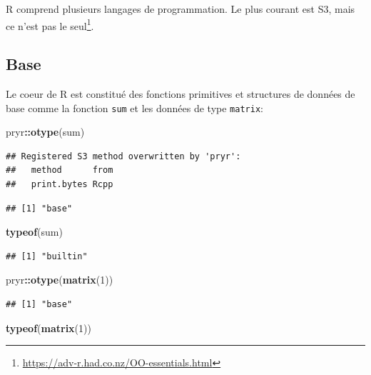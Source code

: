 \documentclass[
  12pt,
  french,
  a4paper,
  extrafontsizes,onecolumn,openright
  ]{memoir}
\newenvironment{Shaded}{\begin{snugshade}}{\end{snugshade}}
\newcommand{\DecValTok}[1]{\textcolor[rgb]{0.00,0.00,0.81}{#1}}
\newcommand{\KeywordTok}[1]{\textcolor[rgb]{0.13,0.29,0.53}{\textbf{#1}}}
\newcommand{\NormalTok}[1]{#1}
\newcommand{\OperatorTok}[1]{\textcolor[rgb]{0.81,0.36,0.00}{\textbf{#1}}}
\begin{document}
R comprend plusieurs langages de programmation.
Le plus courant est S3, mais ce n'est pas le seul\footnote{\url{https://adv-r.had.co.nz/OO-essentials.html}}.

\hypertarget{base}{%
\subsection{Base}\label{base}}

Le coeur de R est constitué des fonctions primitives et structures de données de base comme la fonction \texttt{sum} et les données de type \texttt{matrix}:

\scriptsize

\begin{Shaded}
\begin{Highlighting}[]
\NormalTok{pryr}\OperatorTok{::}\KeywordTok{otype}\NormalTok{(sum)}
\end{Highlighting}
\end{Shaded}

\begin{verbatim}
## Registered S3 method overwritten by 'pryr':
##   method      from
##   print.bytes Rcpp
\end{verbatim}

\begin{verbatim}
## [1] "base"
\end{verbatim}

\begin{Shaded}
\begin{Highlighting}[]
\KeywordTok{typeof}\NormalTok{(sum)}
\end{Highlighting}
\end{Shaded}

\begin{verbatim}
## [1] "builtin"
\end{verbatim}

\begin{Shaded}
\begin{Highlighting}[]
\NormalTok{pryr}\OperatorTok{::}\KeywordTok{otype}\NormalTok{(}\KeywordTok{matrix}\NormalTok{(}\DecValTok{1}\NormalTok{))}
\end{Highlighting}
\end{Shaded}

\begin{verbatim}
## [1] "base"
\end{verbatim}

\begin{Shaded}
\begin{Highlighting}[]
\KeywordTok{typeof}\NormalTok{(}\KeywordTok{matrix}\NormalTok{(}\DecValTok{1}\NormalTok{))}
\end{Highlighting}
\end{Shaded}
\end{document}
